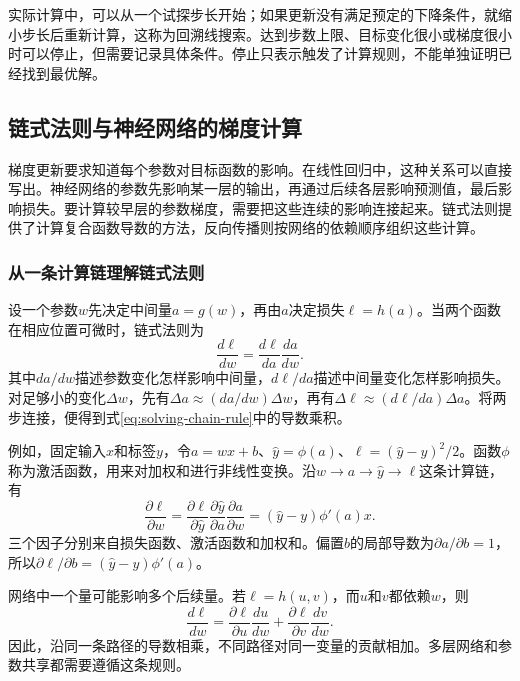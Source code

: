 实际计算中，可以从一个试探步长开始；如果更新没有满足预定的下降条件，就缩小步长后重新计算，这称为回溯线搜索。达到步数上限、目标变化很小或梯度很小时可以停止，但需要记录具体条件。停止只表示触发了计算规则，不能单独证明已经找到最优解。

\subsection{链式法则与神经网络的梯度计算}

梯度更新要求知道每个参数对目标函数的影响。在线性回归中，这种关系可以直接写出。神经网络的参数先影响某一层的输出，再通过后续各层影响预测值，最后影响损失。要计算较早层的参数梯度，需要把这些连续的影响连接起来。链式法则提供了计算复合函数导数的方法，反向传播则按网络的依赖顺序组织这些计算。

\subsubsection{从一条计算链理解链式法则}
设一个参数$w$先决定中间量$a=g(w)$，再由$a$决定损失$\ell=h(a)$。当两个函数在相应位置可微时，链式法则为
\begin{equation}
 \frac{d\ell}{dw}=\frac{d\ell}{da}\frac{da}{dw}.
 \label{eq:solving-chain-rule}
\end{equation}
其中$da/dw$描述参数变化怎样影响中间量，$d\ell/da$描述中间量变化怎样影响损失。对足够小的变化$\Delta w$，先有$\Delta a\approx(da/dw)\Delta w$，再有$\Delta\ell\approx(d\ell/da)\Delta a$。将两步连接，便得到式\eqref{eq:solving-chain-rule}中的导数乘积。

例如，固定输入$x$和标签$y$，令$a=wx+b$、$\hat y=\phi(a)$、$\ell=(\hat y-y)^2/2$。函数$\phi$称为激活函数，用来对加权和进行非线性变换。沿$w\to a\to\hat y\to\ell$这条计算链，有
\begin{equation}
 \frac{\partial\ell}{\partial w}
 =\frac{\partial\ell}{\partial\hat y}
  \frac{\partial\hat y}{\partial a}
  \frac{\partial a}{\partial w}
 =(\hat y-y)\phi'(a)x.
\end{equation}
三个因子分别来自损失函数、激活函数和加权和。偏置$b$的局部导数为$\partial a/\partial b=1$，所以$\partial\ell/\partial b=(\hat y-y)\phi'(a)$。

网络中一个量可能影响多个后续量。若$\ell=h(u,v)$，而$u$和$v$都依赖$w$，则
\begin{equation}
 \frac{d\ell}{dw}
 =\frac{\partial\ell}{\partial u}\frac{du}{dw}
 +\frac{\partial\ell}{\partial v}\frac{dv}{dw}.
\end{equation}
因此，沿同一条路径的导数相乘，不同路径对同一变量的贡献相加。多层网络和参数共享都需要遵循这条规则。

